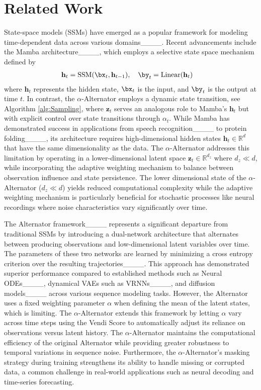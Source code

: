 \section{Related Work}
\label{sec:related}

 State-space models (SSMs) have emerged as a popular framework for modeling time-dependent data across various domains____. Recent advancements include the Mamba architecture____, which employs a selective state space mechanism defined by 
\begin{align*}
    \mathbf{h}_t &= \text{SSM}(\bx_t, \mathbf{h}_{t-1}), \quad \by_t = \text{Linear}(\mathbf{h}_t)
\end{align*}
where $\mathbf{h}_t$ represents the hidden state, $\bx_t$ is the input, and $\by_t$ is the output at time $t$. In contrast, the $\alpha$-Alternator employs a dynamic state transition, see Algorithm \ref{alg:Sampling}, where $\mathbf{z}_t$ serves an analogous role to Mamba's $\mathbf{h}_t$ but with explicit control over state transitions through $\alpha_t$. While Mamba has demonstrated success in applications from speech recognition____ to protein folding____, its architecture requires high-dimensional hidden states $\mathbf{h}_t \in \mathbb{R}^d$ that have the same dimensionality as the data. The $\alpha$-Alternator addresses this limitation by operating in a lower-dimensional latent space $\mathbf{z}_t \in \mathbb{R}^{d_z}$ where $d_z \ll d$, while incorporating the adaptive weighting mechanism to balance between observation influence and state persistence. The lower dimensional state of the $\alpha$-Alternator ($d_z \ll d$) yields reduced computational complexity while the adaptive weighting mechanism is particularly beneficial for stochastic processes like neural recordings where noise characteristics vary significantly over time.

 The Alternator framework____ represents a significant departure from traditional SSMs by introducing a dual-network architecture that alternates between producing observations and low-dimensional latent variables over time. The parameters of these two networks are learned by minimizing a cross entropy criterion over the resulting trajectories____. This approach has demonstrated superior performance compared to established methods such as Neural ODEs____, dynamical VAEs such as VRNNs____, and diffusion models____ across various sequence modeling tasks. However, the Alternator uses a fixed weighting parameter $\alpha$ when defining the mean of the latent states, which is limiting. The $\alpha$-Alternator extends this framework by letting $\alpha$ vary across time steps using the Vendi Score to automatically adjust its reliance on observations versus latent history. The $\alpha$-Alternator maintains the computational efficiency of the original Alternator while providing greater robustness to temporal variations in sequence noise. Furthermore, the $\alpha$-Alternator's masking strategy during training strengthens its ability to handle missing or corrupted data, a common challenge in real-world applications such as neural decoding and time-series forecasting.